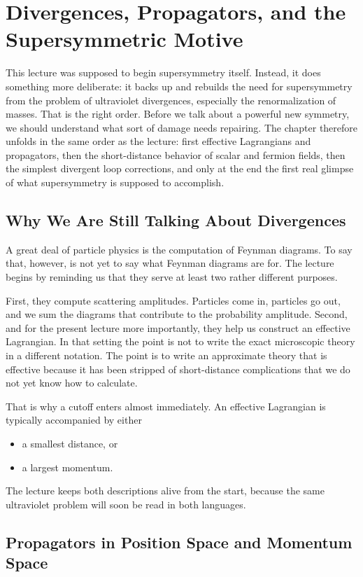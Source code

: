 \chapter{Divergences, Propagators, and the Supersymmetric Motive}

This lecture was supposed to begin supersymmetry itself. Instead, it does something more deliberate: it backs up and rebuilds the need for supersymmetry from the problem of ultraviolet divergences, especially the renormalization of masses. That is the right order. Before we talk about a powerful new symmetry, we should understand what sort of damage needs repairing. The chapter therefore unfolds in the same order as the lecture: first effective Lagrangians and propagators, then the short-distance behavior of scalar and fermion fields, then the simplest divergent loop corrections, and only at the end the first real glimpse of what supersymmetry is supposed to accomplish.

\section{Why We Are Still Talking About Divergences}

A great deal of particle physics is the computation of Feynman diagrams. To say that, however, is not yet to say what Feynman diagrams are for. The lecture begins by reminding us that they serve at least two rather different purposes.

First, they compute scattering amplitudes. Particles come in, particles go out, and we sum the diagrams that contribute to the probability amplitude. Second, and for the present lecture more importantly, they help us construct an effective Lagrangian. In that setting the point is not to write the exact microscopic theory in a different notation. The point is to write an approximate theory that is effective because it has been stripped of short-distance complications that we do not yet know how to calculate.

That is why a cutoff enters almost immediately. An effective Lagrangian is typically accompanied by either
\begin{itemize}
\item a smallest distance, or
\item a largest momentum.
\end{itemize}
The lecture keeps both descriptions alive from the start, because the same ultraviolet problem will soon be read in both languages.

\section{Propagators in Position Space and Momentum Space}


